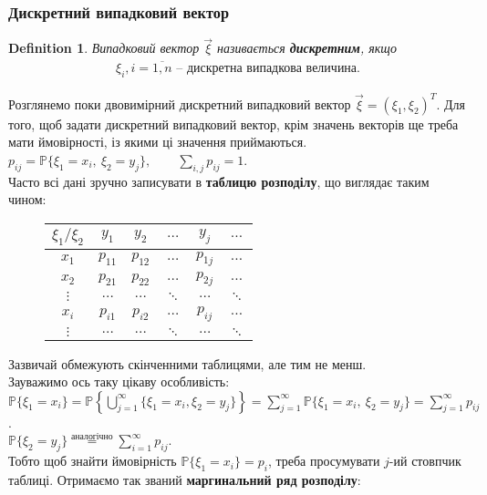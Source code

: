 \documentclass[a4paper, 10pt]{article}
\theoremstyle{theoremdd}
\newtheorem{definition}[theorem]{Definition}
\begin{document}
\subsubsection{Дискретний випадковий вектор}
\begin{definition}
Випадковий вектор $\vec{\xi}$ називається \textbf{дискретним}, якщо
\begin{align*}
\xi_i, i = \overline{1,n} \text{ -- дискретна випадкова величина}.
\end{align*}
\end{definition}
\noindent
Розглянемо поки двовимірний дискретний випадковий вектор $\vec{\xi} = (\xi_1,\xi_2)^T$. Для того, щоб задати дискретний випадковий вектор, крім значень векторів ще треба мати ймовірності, із якими ці значення приймаються.\\
$p_{ij} = \mathbb{P}\{\xi_1 = x_i,\ \xi_2 = y_j\},\qquad \displaystyle\sum_{i,j} p_{ij} = 1$.
\bigskip \\
Часто всі дані зручно записувати в \textbf{таблицю розподілу}, що виглядає таким чином:
\begin{figure}[H]
\centering
\begin{tabular}{c|c|c|c|c|c}
 $\xi_1/ \xi_2$ & $y_1$ & $y_2$ & $\dots$ & $y_j$ & $\dots$ \\
 \hline
 $x_1$ & $p_{11}$ & $p_{12}$ & $\dots$ & $p_{1j}$ & $\dots$ \\ 
 \hline
  $x_2$ & $p_{21}$ & $p_{22}$ & $\dots$ & $p_{2j}$ & $\dots$ \\ 
  \hline
  $\vdots$ & $\dots$ & $\dots$ & $\ddots$ & $\dots$ & $\ddots$ \\
  \hline
  $x_i$ & $p_{i1}$ & $p_{i2}$ & $\dots$ & $p_{ij}$ & $\dots$ \\ 
  \hline
  $\vdots$ & $\dots$ & $\dots$ & $\ddots$ & $\dots$ & $\ddots$
\end{tabular}
\end{figure}
\noindent
Зазвичай обмежують скінченними таблицями, але тим не менш.\\
Зауважимо ось таку цікаву особливість:\\
$\mathbb{P}\{\xi_1 = x_i\} = \displaystyle\mathbb{P}\left\{ \bigcup_{j=1}^\infty \{\xi_1 = x_i, \xi_2 = y_j\} \right\} = \sum_{j=1}^\infty \mathbb{P}\{\xi_1 = x_i,\ \xi_2 = y_j\} = \sum_{j=1}^\infty p_{ij}$.\\
$\mathbb{P}\{\xi_2 = y_j\} \overset{\text{аналогічно}}{=} \displaystyle\sum_{i=1}^\infty p_{ij}$.\\
Тобто щоб знайти ймовірність $\mathbb{P}\{\xi_1 = x_i\} = p_i$, треба просумувати $j$-ий стовпчик таблиці. Отримаємо так званий \textbf{маргинальний ряд розподілу}:
\end{document}
